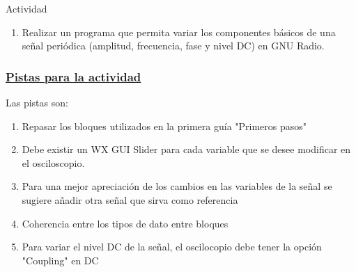 \begin{frame}{Actividad}
	\begin{enumerate}[1.]
		
		\item{Realizar un programa que permita variar los componentes básicos de una señal periódica (amplitud, frecuencia, fase y nivel DC) en GNU Radio.}\\
		
	\end{enumerate}
\end{frame}

\begin{frame}
	
	\frametitle{\underline{\textbf{Pistas para la actividad}}}
	
	Las pistas son:
	\begin{enumerate}[1.]
		
		\item {Repasar los bloques utilizados en la primera guía "Primeros pasos"}\\
		\item {Debe existir un WX GUI Slider para cada variable que se desee modificar en el osciloscopio.}\\
		\item {Para una mejor apreciación  de los cambios en las variables de la señal se sugiere añadir otra señal que sirva como referencia}\\
		\item {Coherencia entre los tipos de dato entre bloques}\\
		\item {Para variar el nivel DC de la señal, el oscilocopio debe tener la opción "Coupling" en DC}\\
		
	\end{enumerate}
\end{frame}
